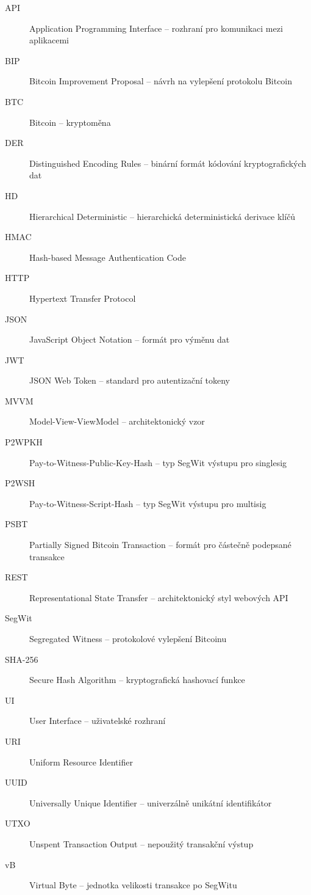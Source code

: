 \documentclass[12pt,a4paper]{report}
\begin{document}
\begin{description}
\item[API] Application Programming Interface -- rozhraní pro komunikaci mezi aplikacemi
\item[BIP] Bitcoin Improvement Proposal -- návrh na vylepšení protokolu Bitcoin
\item[BTC] Bitcoin -- kryptoměna
\item[DER] Distinguished Encoding Rules -- binární formát kódování kryptografických dat
\item[HD] Hierarchical Deterministic -- hierarchická deterministická derivace klíčů
\item[HMAC] Hash-based Message Authentication Code
\item[HTTP] Hypertext Transfer Protocol
\item[JSON] JavaScript Object Notation -- formát pro výměnu dat
\item[JWT] JSON Web Token -- standard pro autentizační tokeny
\item[MVVM] Model-View-ViewModel -- architektonický vzor
\item[P2WPKH] Pay-to-Witness-Public-Key-Hash -- typ SegWit výstupu pro singlesig
\item[P2WSH] Pay-to-Witness-Script-Hash -- typ SegWit výstupu pro multisig
\item[PSBT] Partially Signed Bitcoin Transaction -- formát pro částečně podepsané transakce
\item[REST] Representational State Transfer -- architektonický styl webových API
\item[SegWit] Segregated Witness -- protokolové vylepšení Bitcoinu
\item[SHA-256] Secure Hash Algorithm -- kryptografická hashovací funkce
\item[UI] User Interface -- uživatelské rozhraní
\item[URI] Uniform Resource Identifier
\item[UUID] Universally Unique Identifier -- univerzálně unikátní identifikátor
\item[UTXO] Unspent Transaction Output -- nepoužitý transakční výstup
\item[vB] Virtual Byte -- jednotka velikosti transakce po SegWitu
\end{description}
\end{document}
